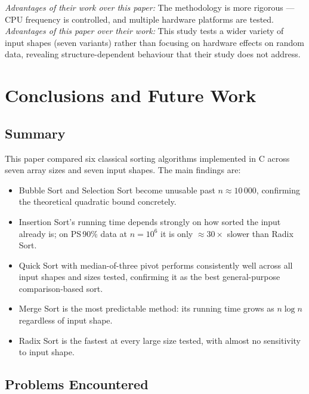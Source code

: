 \documentclass[11pt,a4paper]{article}
\begin{document}
\textit{Advantages of their work over this paper:} The methodology is more rigorous --- CPU frequency is controlled, and multiple hardware platforms are tested.\\
\textit{Advantages of this paper over their work:} This study tests a wider variety of input shapes (seven variants) rather than focusing on hardware effects on random data, revealing structure-dependent behaviour that their study does not address.

\section{Conclusions and Future Work}
\label{sec:conclusion}

\subsection{Summary}

This paper compared six classical sorting algorithms implemented in C across seven array sizes and seven input shapes. The main findings are:

\begin{itemize}[noitemsep]
  \item Bubble Sort and Selection Sort become unusable past $n \approx 10\,000$, confirming the theoretical quadratic bound concretely.
  \item Insertion Sort's running time depends strongly on how sorted the input already is; on PS\,90\% data at $n = 10^6$ it is only $\approx 30\times$ slower than Radix Sort.
  \item Quick Sort with median-of-three pivot performs consistently well across all input shapes and sizes tested, confirming it as the best general-purpose comparison-based sort.
  \item Merge Sort is the most predictable method: its running time grows as $n \log n$ regardless of input shape.
  \item Radix Sort is the fastest at every large size tested, with almost no sensitivity to input shape.
\end{itemize}

\subsection{Problems Encountered}
\end{document}
